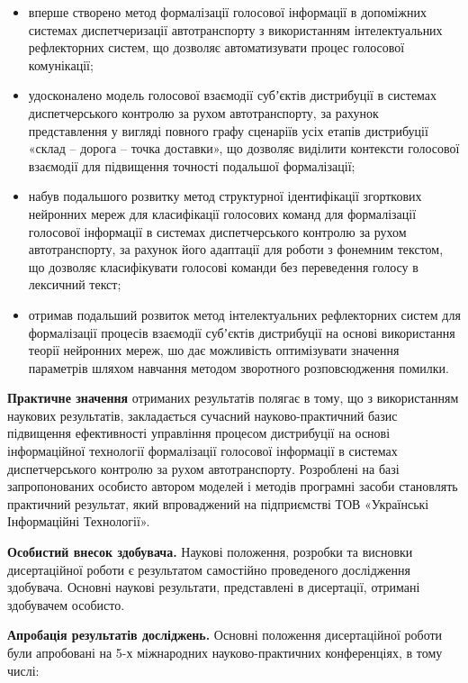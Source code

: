 \begin{itemize}
	\item вперше створено метод формалізації голосової інформації в допоміжних системах диспетчеризації автотранспорту з використанням інтелектуальних рефлекторних систем, що дозволяє автоматизувати процес голосової комунікації;
	\item удосконалено модель голосової взаємодії субʼєктів дистрибуції в системах диспетчерського контролю за рухом автотранспорту, за рахунок представлення у вигляді повного графу сценаріїв усіх етапів дистрибуції «склад – дорога – точка доставки», що дозволяє виділити контексти голосової взаємодії для підвищення точності подальшої формалізації;
	\item набув подальшого розвитку метод структурної ідентифікації згорткових нейронних мереж для класифікації голосових команд для формалізації голосової інформації в системах диспетчерського контролю за рухом автотранспорту, за рахунок його адаптації для роботи з фонемним текстом, що дозволяє класифікувати голосові команди без переведення голосу в лексичний текст;
	\item отримав подальший розвиток метод інтелектуальних рефлекторних систем для формалізації процесів взаємодії субʼєктів дистрибуції на основі використання теорії нейронних мереж, шо дає можливість оптимізувати значення параметрів шляхом навчання методом зворотного розповсюдження помилки.
\end{itemize}

\textbf{Практичне значення} отриманих результатів полягає в тому, що з використанням наукових результатів, закладається сучасний науково-практичний базис підвищення ефективності управління процесом дистрибуції на основі інформаційної технології формалізації голосової інформації в системах диспетчерського контролю за рухом автотранспорту. Розроблені на базі запропонованих особисто автором моделей і методів програмні засоби становлять практичний результат, який впроваджений на підприємстві ТОВ «Українські Інформаційні Технології».

\textbf{Особистий внесок здобувача.} Наукові положення, розробки та висновки дисертаційної роботи є результатом самостійно проведеного дослідження здобувача. Основні наукові результати, представлені в дисертації, отримані здобувачем особисто.

\textbf{Апробація результатів досліджень.} Основні положення дисертаційної роботи були апробовані на 5-х міжнародних науково-практичних конференціях, в тому числі:

